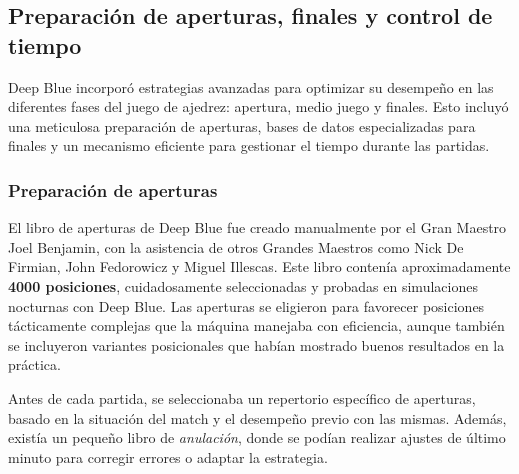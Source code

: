 \documentclass[12pt,a4paper]{article}
\begin{document}
\subsection{Preparación de aperturas, finales y control de tiempo}

Deep Blue incorporó estrategias avanzadas para optimizar su desempeño en las diferentes fases del juego de ajedrez: apertura, medio juego y finales. Esto incluyó una meticulosa preparación de aperturas, bases de datos especializadas para finales y un mecanismo eficiente para gestionar el tiempo durante las partidas.

\subsubsection*{Preparación de aperturas}
El libro de aperturas de Deep Blue fue creado manualmente por el Gran Maestro Joel Benjamin, con la asistencia de otros Grandes Maestros como Nick De Firmian, John Fedorowicz y Miguel Illescas. Este libro contenía aproximadamente \textbf{4000 posiciones}, cuidadosamente seleccionadas y probadas en simulaciones nocturnas con Deep Blue. Las aperturas se eligieron para favorecer posiciones tácticamente complejas que la máquina manejaba con eficiencia, aunque también se incluyeron variantes posicionales que habían mostrado buenos resultados en la práctica.

Antes de cada partida, se seleccionaba un repertorio específico de aperturas, basado en la situación del match y el desempeño previo con las mismas. Además, existía un pequeño libro de \textit{anulación}, donde se podían realizar ajustes de último minuto para corregir errores o adaptar la estrategia.
\end{document}
